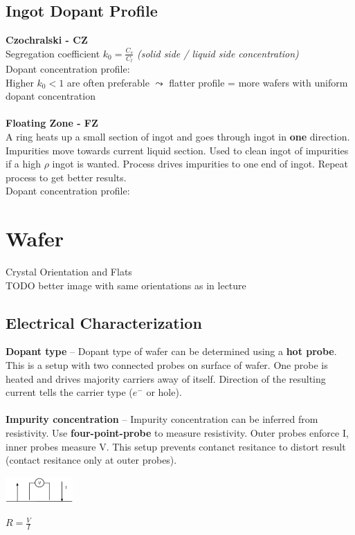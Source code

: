 \documentclass[6pt,letterpaper]{scrartcl}
\begin{document}
\begin{multicols}{3}
\subsection{Ingot Dopant Profile}
\textbf{Czochralski - CZ} \\
Segregation coefficient $k_0 = \frac{C_s}{C_l}$ \textit{(solid side / liquid side concentration)} \\
Dopant concentration profile:  \\
Higher $k_0 < 1$ are often preferable $\leadsto$ flatter profile = more wafers with uniform dopant concentration \\
\\
\textbf{Floating Zone - FZ} \\
A ring heats up a small section of ingot and goes through ingot in \textbf{one} direction. Impurities move towards current liquid section. Used to clean ingot of impurities if a high $\rho$ ingot is wanted. Process drives impurities to one end of ingot. Repeat process to get better results.\\
Dopant concentration profile: 

\section{Wafer}
Crystal Orientation and Flats \\
TODO better image with same orientations as in lecture


\subsection{Electrical Characterization}
\textbf{Dopant type} -- Dopant type of wafer can be determined using a \textbf{hot probe}. This is a setup with two connected probes on surface of wafer. One probe is heated and drives majority carriers away of itself. Direction of the resulting current tells the carrier type ($e^-$ or hole). \\
\\
\textbf{Impurity concentration} -- Impurity concentration can be inferred from resistivity. Use \textbf{four-point-probe} to measure resistivity. Outer probes enforce I, inner probes measure V. This setup prevents contanct resitance to distort result (contact resitance only at outer probes).
\begin{center}
	\parbox{3cm}{
		\includegraphics[height=1cm]{./img/wafer/four-point-probe.pdf}
	}
	\parbox{1cm}{
		$R=\frac{V}{I}$
	}
\end{center}


\end{multicols}
\end{document}
